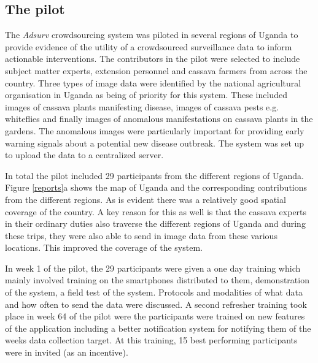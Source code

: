 \documentclass[letterpaper]{article} %
\begin{document}
\subsection{The pilot}
The \emph{Adsurv} crowdsourcing system was piloted in several regions of Uganda to provide evidence of the utility of a crowdsourced surveillance data to inform actionable interventions. The contributors in the pilot were selected to include subject matter experts, extension personnel and cassava farmers from across the country. Three types of image data were identified by the national agricultural organisation in Uganda as being of priority for this system. These included images of cassava plants manifesting disease, images of cassava pests e.g. whiteflies and finally images of anomalous manifestations on cassava plants in the gardens. The anomalous images were particularly important for providing early warning signals about a potential new disease outbreak. The system was set up to upload the data to a centralized server. 

In total the pilot included 29 participants from the different regions of Uganda. Figure \ref{reports}a shows the map of Uganda and the corresponding contributions from the different regions. As is evident there was a relatively good spatial coverage of the country. A key reason for this as well is that the cassava experts in their ordinary duties also traverse the different regions of Uganda and during these trips, they were also able to send in image data from these various locations. This improved the coverage of the system. 

In week 1 of the pilot, the 29 participants were given a one day training which mainly involved training on the smartphones distributed to them, demonstration of the system, a field test of the system. Protocols and modalities of what data and how often to send the data were discussed. A second refresher training took place in week 64 of the pilot were the participants were trained on new features of the application including a better notification system for notifying them of the weeks data collection target. At this training, 15 best performing participants were in invited (as an incentive).
\end{document}
